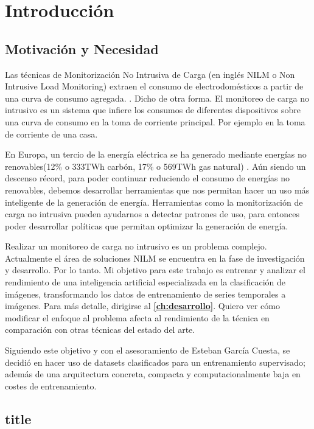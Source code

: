 
\chapter{Introducción}
\label{ch:intro}

\section{Motivación y Necesidad}
\label{sec:motivacionyobjetivos}

Las técnicas de Monitorización No Intrusiva de Carga (en inglés NILM o Non Intrusive Load Monitoring) extraen el consumo de electrodomésticos a partir de una curva de consumo agregada. \autocite[1]{NILMreview}. Dicho de otra forma. El monitoreo de carga no intrusivo es un sistema que infiere los consumos de diferentes dispositivos sobre una curva de consumo en la toma de corriente principal. Por ejemplo en la toma de corriente de una casa.

En Europa, un tercio de la energía eléctrica se ha generado mediante energías no renovables(12\% o 333TWh carbón, 17\% o 569TWh gas natural)\autocite{energyeurope} \autocite{ember2024european}. Aún siendo un descenso récord, para poder continuar reduciendo el consumo de energías no renovables, debemos desarrollar herramientas que nos permitan hacer un uso más inteligente de la generación de energía. Herramientas como la monitorización de carga no intrusiva pueden ayudarnos a detectar patrones de uso\autocite[11]{nilmstateoftheart}, para entonces poder desarrollar políticas que permitan optimizar la generación de energía. 




Realizar un monitoreo de carga no intrusivo es un problema complejo. Actualmente el área de soluciones NILM se encuentra en la fase de investigación y desarrollo. Por lo tanto. Mi objetivo para este trabajo es entrenar y analizar el rendimiento de una inteligencia artificial especializada en la clasificación de imágenes, transformando los datos de entrenamiento de series temporales a imágenes. Para más detalle, dirigirse al \textbf{\autoref{ch:desarrollo}}. Quiero ver cómo modificar el enfoque al problema afecta al rendimiento de la técnica en comparación con otras técnicas del estado del arte. 

Siguiendo este objetivo y con el asesoramiento de Esteban García Cuesta, se decidió en hacer uso de datasets clasificados para un entrenamiento supervisado; además de una arquitectura concreta, compacta y computacionalmente baja en costes de entrenamiento. 

\section{title}

